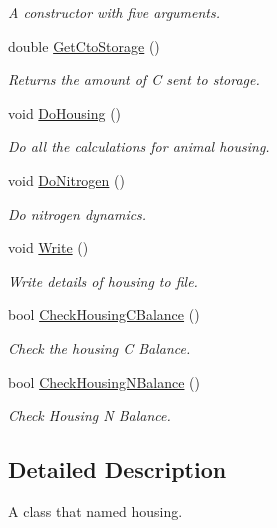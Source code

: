 \begin{DoxyCompactItemize}
\begin{DoxyCompactList}\small\item\em A constructor with five arguments. \end{DoxyCompactList}\item 
double \mbox{\hyperlink{classhousing_ad26e09572df342d9e0b17400f24720ef}{Get\+Cto\+Storage}} ()
\begin{DoxyCompactList}\small\item\em Returns the amount of C sent to storage. \end{DoxyCompactList}\item 
void \mbox{\hyperlink{classhousing_af7e45d8da4358309aaacb9d24bb19523}{Do\+Housing}} ()
\begin{DoxyCompactList}\small\item\em Do all the calculations for animal housing. \end{DoxyCompactList}\item 
void \mbox{\hyperlink{classhousing_a50306a2782cf072bc5b353331f001cf9}{Do\+Nitrogen}} ()
\begin{DoxyCompactList}\small\item\em Do nitrogen dynamics. \end{DoxyCompactList}\item 
void \mbox{\hyperlink{classhousing_a589942e33cabe72d088f1428d076d8ac}{Write}} ()
\begin{DoxyCompactList}\small\item\em Write details of housing to file. \end{DoxyCompactList}\item 
bool \mbox{\hyperlink{classhousing_afc648290d69e019a0ef2b6bf0ef4dc43}{Check\+Housing\+C\+Balance}} ()
\begin{DoxyCompactList}\small\item\em Check the housing C Balance. \end{DoxyCompactList}\item 
bool \mbox{\hyperlink{classhousing_af5df42adc33faded1ac9814881629c85}{Check\+Housing\+N\+Balance}} ()
\begin{DoxyCompactList}\small\item\em Check Housing N Balance. \end{DoxyCompactList}\end{DoxyCompactItemize}


\subsection{Detailed Description}
A class that named housing. 

